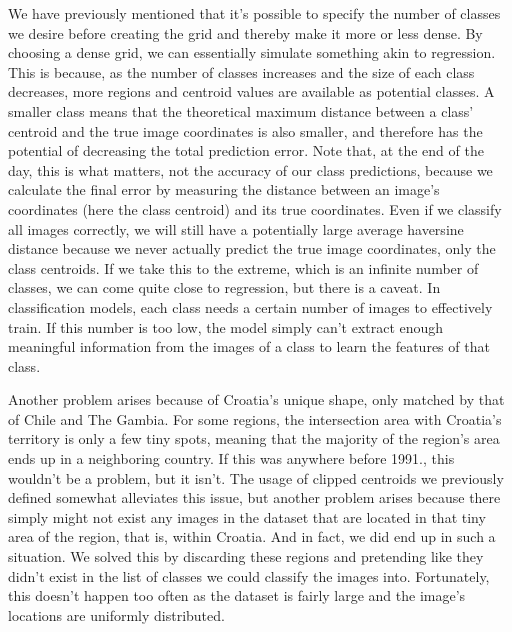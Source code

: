 \documentclass[]{article}
\begin{document}
We have previously mentioned that it's possible to specify the number of
classes we desire before creating the grid and thereby make it more or
less dense. By choosing a dense grid, we can essentially simulate
something akin to regression. This is because, as the number of classes
increases and the size of each class decreases, more regions and
centroid values are available as potential classes. A smaller class
means that the theoretical maximum distance between a class' centroid
and the true image coordinates is also smaller, and therefore has the
potential of decreasing the total prediction error. Note that, at the
end of the day, this is what matters, not the accuracy of our class
predictions, because we calculate the final error by measuring the
distance between an image's coordinates (here the class centroid) and
its true coordinates. Even if we classify all images correctly, we will
still have a potentially large average haversine distance because we
never actually predict the true image coordinates, only the class
centroids. If we take this to the extreme, which is an infinite number
of classes, we can come quite close to regression, but there is a
caveat. In classification models, each class needs a certain number of
images to effectively train. If this number is too low, the model simply
can't extract enough meaningful information from the images of a class
to learn the features of that class.

Another problem arises because of Croatia's unique shape, only matched
by that of Chile and The Gambia. For some regions, the intersection area
with Croatia's territory is only a few tiny spots, meaning that the
majority of the region's area ends up in a neighboring country. If this
was anywhere before 1991., this wouldn't be a problem, but it isn't. The
usage of clipped centroids we previously defined somewhat alleviates
this issue, but another problem arises because there simply might not
exist any images in the dataset that are located in that tiny area of
the region, that is, within Croatia. And in fact, we did end up in such
a situation. We solved this by discarding these regions and pretending
like they didn't exist in the list of classes we could classify the
images into. Fortunately, this doesn't happen too often as the dataset
is fairly large and the image's locations are uniformly distributed.
\end{document}
